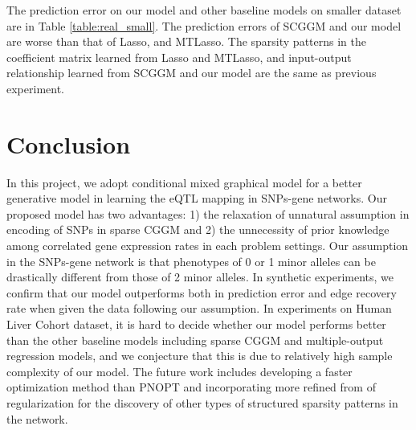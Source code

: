 \documentclass{article}
\begin{document}
The prediction error on our model and other baseline models on smaller dataset are in Table \ref{table:real_small}. The prediction errors of SCGGM and our model are worse than that of Lasso, and MTLasso. The sparsity patterns in the coefficient matrix learned from Lasso and MTLasso, and input-output relationship learned from SCGGM and our model are the same as previous experiment. 



\section{Conclusion}
In this project, we adopt conditional mixed graphical model for a better generative model in learning the eQTL mapping in SNPs-gene networks. Our proposed model has two advantages: 1) the relaxation of unnatural assumption in encoding of SNPs in sparse CGGM and 2) the unnecessity of prior knowledge among correlated gene expression rates in each problem settings. Our assumption in the SNPs-gene network is that phenotypes of 0 or 1 minor alleles can be drastically different from those of 2 minor alleles. In synthetic experiments, we confirm that our model outperforms both in prediction error and edge recovery rate when given the data following our assumption. In experiments on Human Liver Cohort dataset, it is hard to decide whether our model performs better than the other baseline models including sparse CGGM and multiple-output regression models, and we conjecture that this is due to relatively high sample complexity of our model. The future work includes developing a faster optimization method than PNOPT and incorporating more refined from of regularization for the discovery of other types of structured sparsity patterns in the network.





\nocite{*}


\end{document}
